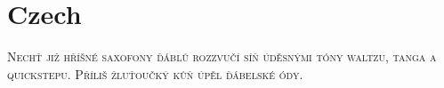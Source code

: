 

\presection\section*{\checkno Czech}\postsection

\textsc{Nechť již hříšné saxofony ďáblů rozzvučí síň úděsnými 
tóny waltzu, tanga a quickstepu. Příliš žluťoučký kůň úpěl ďábelské ódy.}